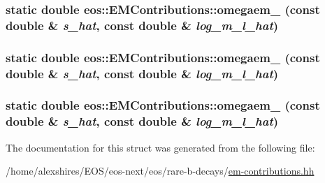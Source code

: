 \label{structeos_1_1EMContributions_a8b4ae92fda701eafc27649d2d40862ca}
\hypertarget{structeos_1_1EMContributions_a61b875199e526faafedacc996a00168d}{
\subsubsection[{omegaem\_\-77}]{\setlength{\rightskip}{0pt plus 5cm}static double eos::EMContributions::omegaem\_ (const double \& {\em s\_\-hat}, \/  const double \& {\em log\_\-m\_\-l\_\-hat})}}
\label{structeos_1_1EMContributions_a61b875199e526faafedacc996a00168d}
\hypertarget{structeos_1_1EMContributions_afaa4c022d6686394328ff7b385267b68}{
\subsubsection[{omegaem\_\-79}]{\setlength{\rightskip}{0pt plus 5cm}static double eos::EMContributions::omegaem\_ (const double \& {\em s\_\-hat}, \/  const double \& {\em log\_\-m\_\-l\_\-hat})}}
\label{structeos_1_1EMContributions_afaa4c022d6686394328ff7b385267b68}
\hypertarget{structeos_1_1EMContributions_a31141870ccd13bbd979383f7089f024d}{
\subsubsection[{omegaem\_\-99}]{\setlength{\rightskip}{0pt plus 5cm}static double eos::EMContributions::omegaem\_ (const double \& {\em s\_\-hat}, \/  const double \& {\em log\_\-m\_\-l\_\-hat})}}
\label{structeos_1_1EMContributions_a31141870ccd13bbd979383f7089f024d}


The documentation for this struct was generated from the following file:\begin{DoxyCompactItemize}
\item 
/home/alexshires/EOS/eos-\/next/eos/rare-\/b-\/decays/\hyperlink{em-contributions_8hh}{em-\/contributions.hh}\end{DoxyCompactItemize}
